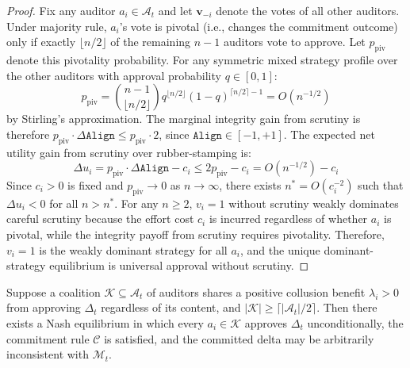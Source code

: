 \begin{proof}
Fix any auditor $a_i \in \mathcal{A}_t$ and let $\mathbf{v}_{-i}$ denote
the votes of all other auditors. Under majority rule, $a_i$'s vote is
pivotal (i.e., changes the commitment outcome) only if exactly
$\lfloor n/2 \rfloor$ of the remaining $n-1$ auditors vote to approve.
Let $p_{\text{piv}}$ denote this pivotality probability. For any symmetric
mixed strategy profile over the other auditors with approval probability
$q \in [0,1]$:
\begin{equation}
    p_{\text{piv}} = \binom{n-1}{\lfloor n/2 \rfloor}
    q^{\lfloor n/2 \rfloor}(1-q)^{\lceil n/2 \rceil - 1}
    = O(n^{-1/2})
\end{equation}
by Stirling's approximation. The marginal integrity gain from scrutiny is
therefore $p_{\text{piv}} \cdot \Delta\texttt{Align} \leq p_{\text{piv}}
\cdot 2$, since $\texttt{Align} \in [-1,+1]$. The expected net utility gain
from scrutiny over rubber-stamping is:
\begin{equation}
    \Delta u_i = p_{\text{piv}} \cdot \Delta\texttt{Align} - c_i
    \leq 2 p_{\text{piv}} - c_i = O(n^{-1/2}) - c_i
\end{equation}
Since $c_i > 0$ is fixed and $p_{\text{piv}} \to 0$ as $n \to \infty$,
there exists $n^* = O(c_i^{-2})$ such that $\Delta u_i < 0$ for all
$n > n^*$. For any $n \geq 2$, $v_i = 1$ without scrutiny weakly
dominates careful scrutiny because the effort cost $c_i$ is incurred
regardless of whether $a_i$ is pivotal, while the integrity payoff
from scrutiny requires pivotality. Therefore, $v_i = 1$ is the weakly
dominant strategy for all $a_i$, and the unique dominant-strategy
equilibrium is universal approval without scrutiny.
\end{proof}

\begin{proposition}
\label{prop:collusion}
Suppose a coalition $\mathcal{K} \subseteq \mathcal{A}_t$ of auditors
shares a positive collusion benefit $\lambda_i > 0$ from approving
$\Delta_t$ regardless of its content, and $|\mathcal{K}| \geq
\lceil |\mathcal{A}_t| / 2 \rceil$. Then there exists a Nash equilibrium
in which every $a_i \in \mathcal{K}$ approves $\Delta_t$ unconditionally,
the commitment rule $\mathcal{C}$ is satisfied, and the committed delta
may be arbitrarily inconsistent with $\mathcal{M}_t$.
\end{proposition}

